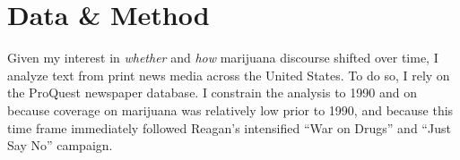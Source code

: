 


\section{Data \& Method}

Given my interest in \textit{whether} and \textit{how} marijuana discourse shifted over time, I analyze text from print news media across the United States. To do so, I rely on the ProQuest newspaper database. I constrain the analysis to 1990 and on because coverage on marijuana was relatively low prior to 1990, and because this time frame immediately followed Reagan's intensified ``War on Drugs'' and ``Just Say No'' campaign. 

